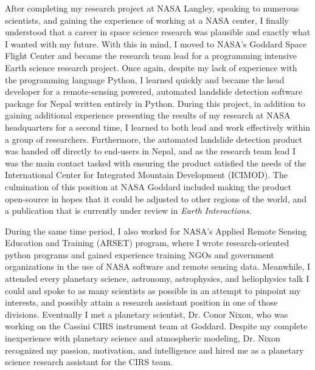 After completing my research project  at NASA Langley, speaking to numerous
scientists, and gaining the experience of  working at a NASA center, I
finally  understood  that  a  career in  space science  research  was
plausible and  exactly what  I wanted  with my  future.  With  this in
mind, I  moved to NASA's  Goddard Space  Flight Center and  became the
research team lead for a  programming intensive Earth science research
project.   Once  again,  despite  my   lack  of  experience  with  the
programming language  Python, I  learned quickly  and became  the head
developer for a remote-sensing  powered, automated landslide detection
software package  for Nepal written  entirely in Python.   During this
project, in  addition to gaining additional  experience presenting the
results of  my research at  NASA headquarters  for a second  time, I
learned  to  both  lead  and   work  effectively  within  a  group  of
researchers.  Furthermore,  the automated landslide  detection product
was handed  off directly to  end-users in  Nepal, and as  the research
team lead  I was  the main  contact tasked  with ensuring  the product
satisfied the needs of the International Center for Integrated Mountain Development (ICIMOD). The culmination of this position
at NASA Goddard  included making the  product open-source in hopes  that it
could be  adjusted to other  regions of  the world, and  a publication
that is currently under review in \textit{Earth Interactions}.

During the same  time period, I also worked for  NASA's Applied Remote
Sensing  Education  and  Training   (ARSET)  program,  where  I  wrote
research-oriented python programs and  gained experience training NGOs
and government  organizations in the  use of NASA software  and remote
sensing  data.    Meanwhile,  I  attended  every   planetary  science,
astronomy, astrophysics, and heliophysics talk I could and spoke to as
many scientists  as possible in  an attempt to pinpoint  my interests,
and  possibly attain  a research  assistant position  in one  of those
divisions. Eventually I  met a planetary scientist,  Dr.  Conor Nixon,
who   was   working  on   the   Cassini   CIRS  instrument   team   at
Goddard. Despite  my complete inexperience with  planetary science and
atmospheric modeling, Dr. Nixon recognized my passion, motivation, and
intelligence and  hired me as  a planetary science  research assistant
for the CIRS team.

